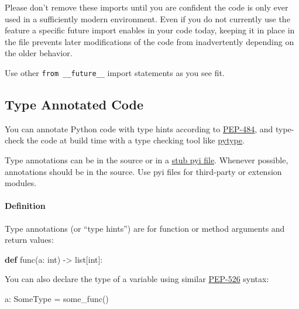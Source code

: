 \documentclass[
]{article}
\newenvironment{Shaded}{}{}
\newcommand{\BuiltInTok}[1]{\textcolor[rgb]{0.00,0.50,0.00}{#1}}
\newcommand{\KeywordTok}[1]{\textcolor[rgb]{0.00,0.44,0.13}{\textbf{#1}}}
\newcommand{\NormalTok}[1]{#1}
\newcommand{\OperatorTok}[1]{\textcolor[rgb]{0.40,0.40,0.40}{#1}}
\begin{document}
Please don't remove these imports until you are confident the code is
only ever used in a sufficiently modern environment. Even if you do not
currently use the feature a specific future import enables in your code
today, keeping it in place in the file prevents later modifications of
the code from inadvertently depending on the older behavior.

Use other \texttt{from\ \_\_future\_\_} import statements as you see
fit.

\subsection{Type Annotated Code}

You can annotate Python code with type hints according to
\href{https://peps.python.org/pep-0484/}{PEP-484}, and type-check the
code at build time with a type checking tool like
\href{https://github.com/google/pytype}{pytype}.

Type annotations can be in the source or in a
\href{https://peps.python.org/pep-0484/\#stub-files}{stub pyi file}.
Whenever possible, annotations should be in the source. Use pyi files
for third-party or extension modules.

\paragraph{Definition}

Type annotations (or ``type hints'') are for function or method
arguments and return values:

\begin{samepage}
\begin{Shaded}
\begin{Highlighting}[]
\KeywordTok{def}\NormalTok{ func(a: }\BuiltInTok{int}\NormalTok{) }\OperatorTok{{-}\textgreater{}} \BuiltInTok{list}\NormalTok{[}\BuiltInTok{int}\NormalTok{]:}
\end{Highlighting}
\end{Shaded}
\end{samepage}

You can also declare the type of a variable using similar
\href{https://peps.python.org/pep-0526/}{PEP-526} syntax:

\begin{samepage}
\begin{Shaded}
\begin{Highlighting}[]
\NormalTok{a: SomeType }\OperatorTok{=}\NormalTok{ some\_func()}
\end{Highlighting}
\end{Shaded}
\end{samepage}
\end{document}
